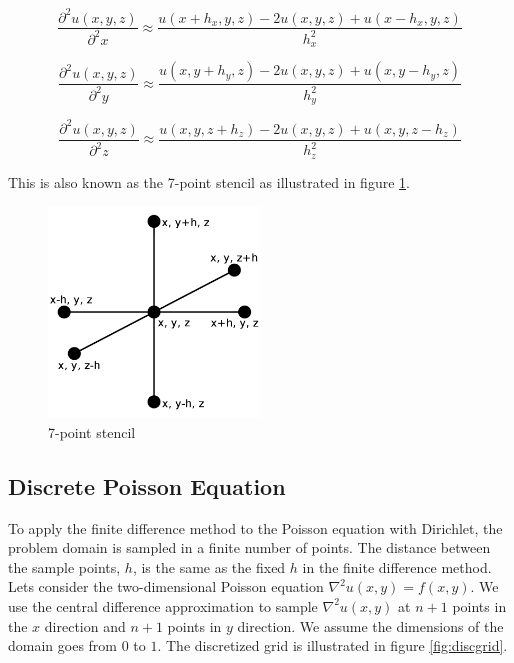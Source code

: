 $$\frac{\partial^2 u(x, y, z)}{\partial^2 x} \approx \frac{u(x+h_x, y, z) - 2u(x, y, z) + u(x-h_x, y, z)}{h_x^2}$$

$$\frac{\partial^2 u(x, y, z)}{\partial^2 y} \approx \frac{u(x, y+h_y, z) - 2u(x, y, z) + u(x, y-h_y, z)}{h_y^2}$$

$$\frac{\partial^2 u(x, y, z)}{\partial^2 z} \approx \frac{u(x, y, z+h_z) - 2u(x, y, z) + u(x, y, z-h_z)}{h_z^2}$$

This is also known as the 7-point stencil as illustrated in figure \ref{fig:7ps}.

\begin{figure}[ht]
	\center
	\includegraphics[width=0.5\textwidth]{images/7_point_stencil}
	\caption{7-point stencil}
	\label{fig:7ps}
\end{figure}

\subsection{Discrete Poisson Equation}

To apply the finite difference method to the Poisson equation with Dirichlet,
the problem domain is sampled in a finite number of points. The distance
between the sample points, $h$, is the same as the fixed $h$ in the finite
difference method. Lets consider the two-dimensional Poisson equation $\nabla^2
u(x, y) = f(x, y)$. We use the central difference approximation to sample
$\nabla^2 u(x, y)$ at $n+1$ points in the $x$ direction and $n+1$ points in $y$
direction. We assume the dimensions of the domain goes from $0$ to $1$. The
discretized grid is illustrated in figure \ref{fig:discgrid}.

